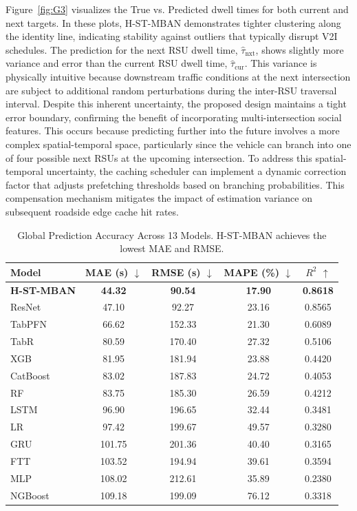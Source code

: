 \documentclass[journal]{IEEEtran}
\begin{document}
Figure~\ref{fig:G3} visualizes the True vs. Predicted dwell times for both current and next targets.
In these plots, H-ST-MBAN demonstrates tighter clustering along the identity line, indicating stability against outliers that typically disrupt V2I schedules.
The prediction for the next RSU dwell time, $\hat{\tau}_{\text{nxt}}$, shows slightly more variance and error than the current RSU dwell time, $\hat{\tau}_{\text{cur}}$. This variance is physically intuitive because downstream traffic conditions at the next intersection are subject to additional random perturbations during the inter-RSU traversal interval. Despite this inherent uncertainty, the proposed design maintains a tight error boundary, confirming the benefit of incorporating multi-intersection social features.
This occurs because predicting further into the future involves a more complex spatial-temporal space, particularly since the vehicle can branch into one of four possible next RSUs at the upcoming intersection.
To address this spatial-temporal uncertainty, the caching scheduler can implement a dynamic correction factor that adjusts prefetching thresholds based on branching probabilities.
This compensation mechanism mitigates the impact of estimation variance on subsequent roadside edge cache hit rates.

\begin{table}[!t]
\centering
\caption{Global Prediction Accuracy Across 13 Models. H-ST-MBAN achieves the lowest MAE and RMSE.}
\label{tab:accuracy}
\begin{tabular}{lcccc}
\toprule
\textbf{Model} & \textbf{MAE (s) $\downarrow$} & \textbf{RMSE (s) $\downarrow$} & \textbf{MAPE (\%) $\downarrow$} & \textbf{$R^2$ $\uparrow$} \\
\midrule
\textbf{H-ST-MBAN} & \textbf{44.32} & \textbf{90.54} & \textbf{17.90} & \textbf{0.8618} \\
ResNet & 47.10 & 92.27 & 23.16 & 0.8565 \\
TabPFN & 66.62 & 152.33 & 21.30 & 0.6089 \\
TabR & 80.59 & 170.40 & 27.32 & 0.5106 \\
XGB & 81.95 & 181.94 & 23.88 & 0.4420 \\
CatBoost & 83.02 & 187.83 & 24.72 & 0.4053 \\
RF & 83.75 & 185.30 & 26.59 & 0.4212 \\
LSTM & 96.90 & 196.65 & 32.44 & 0.3481 \\
LR & 97.42 & 199.67 & 49.57 & 0.3280 \\
GRU & 101.75 & 201.36 & 40.40 & 0.3165 \\
FTT & 103.52 & 194.94 & 39.61 & 0.3594 \\
MLP & 108.02 & 212.61 & 35.89 & 0.2380 \\
NGBoost & 109.18 & 199.09 & 76.12 & 0.3318 \\
\bottomrule
\end{tabular}
\end{table}
\end{document}
